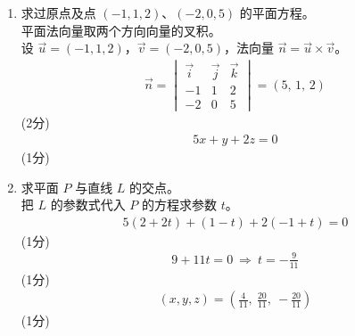 \begin{solution}
    \begin{enumerate}[label=(\alph*)]
        \item 求过原点及点 $(-1,1,2)$、$(-2,0,5)$ 的平面方程。\\
        平面法向量取两个方向向量的叉积。\\
        设 $\vec{u}=(-1,1,2)$，$\vec{v}=(-2,0,5)$，法向量 $\vec{n}=\vec{u}\times\vec{v}$。\\
        \begin{align*}
            \vec{n}=\begin{vmatrix}\vec{i}&\vec{j}&\vec{k}\\-1&1&2\\-2&0&5\end{vmatrix}
            =(5,\,1,\,2)
        \end{align*}
        \hfill (2分) \\
        \begin{align*}
            5x+y+2z=0
        \end{align*}
        \hfill (1分)

        \item 求平面 $P$ 与直线 $L$ 的交点。\\
        把 $L$ 的参数式代入 $P$ 的方程求参数 $t$。\\
        \begin{align*}
            5(2+2t)+(1-t)+2(-1+t)=0
        \end{align*}
        \hfill (1分) \\
        \begin{align*}
            9+11t=0\ \Rightarrow\ t=-\frac{9}{11}
        \end{align*}
        \hfill (1分) \\
        \begin{align*}
            (x,y,z)=\left(\frac{4}{11},\ \frac{20}{11},\ -\frac{20}{11}\right)
        \end{align*}
        \hfill (1分)
    \end{enumerate}
\end{solution}

